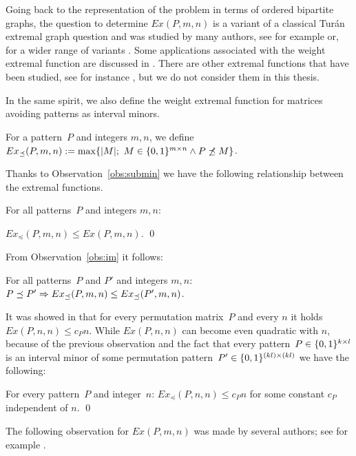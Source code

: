 Going back to the representation of the problem in terms of ordered bipartite graphs, the question to determine $Ex(P,m,n)$ is a variant of a classical Tur{\'a}n extremal graph question and was studied by many authors, see for example \cite{tardos, furedi} or, for a wider range of variants \cite{brass, claesson, klazar, pach}. Some applications associated with the weight extremal function are discussed in \cite{fulek}. There are other extremal functions that have been studied, see for instance \cite{kyncl}, but we do not consider them in this thesis.

In the same spirit, we also define the weight extremal function for matrices avoiding patterns as interval minors.

\begin{defn}
For a pattern~$P$ and integers $m,n$, we define $Ex_{\preceq}(P,m,n):=\max\{|M|;\ M\in\Mat\wedge\PnimM\}$.
\end{defn}

Thanks to Observation~\ref{obs:submin} we have the following relationship between the extremal functions.

\begin{obs}
\label{obs:exm<ex}
For all patterns~$P$ and integers $m,n$:

$Ex_{\preceq}(P,m,n)\leq Ex(P,m,n)$. \qed
\end{obs}

From Observation~\ref{obs:im} it follows:

\begin{obs}
For all patterns~$P$ and $P'$ and integers $m,n$: $P\preceq P'\Rightarrow Ex_{\preceq}(P,m,n)\leq Ex_{\preceq}(P',m,n)$.
\end{obs}

It was showed in \cite{Marcus} that for every permutation matrix~$P$ and every $n$ it holds $Ex(P,n,n)\leq c_Pn$. While $Ex(P,n,n)$ can become even quadratic with $n$, because of the previous observation and the fact that every pattern~$P\in\{0,1\}^{k\times l}$ is an interval minor of some permutation pattern~$P'\in\{0,1\}^{(kl)\times(kl)}$ we have the following:

\begin{prop}
For every pattern~$P$ and integer~$n$: $Ex_{\preceq}(P,n,n)\leq c_Pn$ for some constant $c_P$ independent of $n$. \qed
\end{prop}

The following observation for $Ex(P,m,n)$ was made by several authors; see for example \cite{cibulka09, fulek}.

